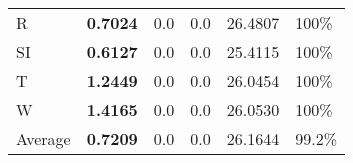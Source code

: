 \documentclass[11pt, a4paper]{article}
\begin{document}
\begin{table}[H]
\begin{tabular}{llllll}
R                                & \textbf{0.7024}                   & 0.0                               & 0.0                                  & 26.4807                                     & 100\%                             \\
SI                        & \textbf{0.6127}                   & 0.0                               & 0.0                                  & 25.4115                                     & 100\%                             \\
T                              & \textbf{1.2449}                   & 0.0                               & 0.0                                  & 26.0454                                     & 100\%                             \\
W                             & \textbf{1.4165}                   & 0.0                               & 0.0                                  & 26.0530                                     & 100\%                             \\ \hline
Average                               & \textbf{0.7209}                   & 0.0                               & 0.0                                  & 26.1644                                     & 99.2\%
\end{tabular}
\end{table}
\end{document}
